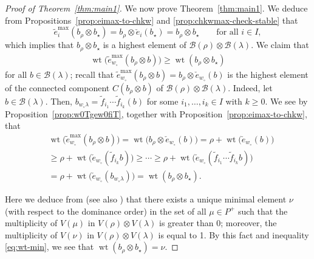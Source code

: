 \documentclass[reqno]{amsart}
\theoremstyle{definition}
\theoremstyle{remark}
\numberwithin{equation}{section}
\newcommand{\B}{\mathcal{B}}
\newcommand{\wt}{\operatorname{wt}}
\newcommand{\te}{\tilde e}
\newcommand{\tf}{\tilde f}
\newcommand{\chke}{\check e}
\newcommand{\Bl}{\B(\lambda)}
\begin{document}
	\begin{proof}[Proof of Theorem~\ref{thm:main1}]
		
		We now prove Theorem~\ref{thm:main1}.
		We deduce from Propositions~\ref{prop:eimax-to-chkw} and  \ref{prop:chkwmax-check-stable} that
		\[
		\te_i^{\max}(b_\rho\otimes{b_\star})=b_\rho\otimes\chke_{i}(b_\star)=b_\rho\otimes{b_\star}
		\qquad\text{for all }i\in I,
		\]
		which implies that $b_\rho\otimes{b_\star}$ is a highest element of $\B(\rho)\otimes\B(\lambda)$.
		We claim that 
		\begin{align}\label{eq:wt-min}
			\wt\bigl(\te_{w_\circ}^{\max}(b_\rho\otimes b)\bigr)\ge\wt(b_\rho\otimes{b_\star})
		\end{align}
		for all $b\in\Bl$; 
		recall that $\te_{w_\circ}^{\max}(b_\rho\otimes b)=b_\rho\otimes\chke_{w_\circ}(b)$ is the highest element of the connected component $C(b_\rho\otimes b)$ of $\B(\rho)\otimes\Bl$.
		Indeed,
		let $b\in\Bl$.
		Then, $b_{w_\circ\lambda}=\tf_{i_1}\cdots \tf_{i_k}(b)$ for some $i_1,\dots,i_k\in I$ with $k\ge 0$.
		We see by Proposition~\ref{prop:w0Tgew0fiT}, together with  Proposition~\ref{prop:eimax-to-chkw}, that
		\begin{align*}
			&\wt\bigl(\te_{w_\circ}^{\max}(b_\rho\otimes b)\bigr)
			=\wt\bigl(b_\rho\otimes\chke_{w_\circ}(b)\bigr)
			=\rho+\wt\bigl(\chke_{w_\circ}(b)\bigr)\\
			&\ge \rho+\wt\bigl(\chke_{w_\circ}(\tf_{i_k}b)\bigr)\ge\cdots\ge \rho+\wt\bigl(\chke_{w_\circ}(\tf_{i_{1}}\cdots\tf_{i_k}b)\bigr)\\
			&=\rho+\wt\bigl(\chke_{w_\circ}(b_{w_\circ\lambda})\bigr)=\wt(b_\rho\otimes b_\star).
		\end{align*}
		
		Here we deduce from 
		\cite{prv1967} (see also \cite[\S 3]{khare2012})
		that there exists a unique minimal element $\nu$ (with respect to the dominance order) in the set of all $\mu\in P^+$ such that the multiplicity of $V(\mu)$
		in $V(\rho)\otimes V(\lambda)$ is greater than 0;
		moreover, the multiplicity of $V(\nu)$ in $V(\rho)\otimes V(\lambda)$ is equal to 1.
		By this fact and inequality \eqref{eq:wt-min},
		we see that $\wt(b_\rho\otimes b_{\star})=\nu.$
		

\end{proof}
\end{document}

